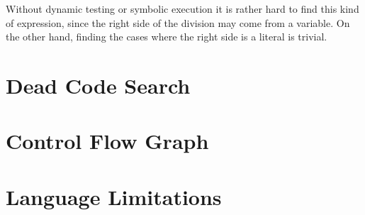 Without dynamic testing or symbolic execution it is rather hard to find this kind of expression, since the right side of the division may come from a variable. On the other hand, finding the cases where the right side is a literal is trivial.

\section{Dead Code Search}

\section{Control Flow Graph}

\section{Language Limitations}
